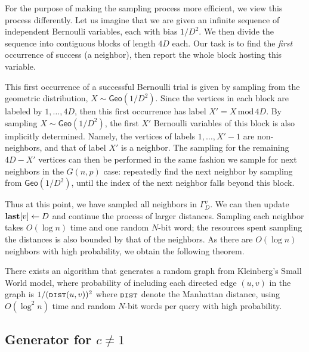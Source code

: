 For the purpose of making the sampling process more efficient, we view this process differently. Let us imagine that we are given an infinite sequence of independent Bernoulli variables, each with bias $1/D^2$.
We then divide the sequence into contiguous blocks of length $4D$ each.
Our task is to find the \emph{first} occurrence of success (a neighbor), then report the whole block hosting this variable.

This first occurrence of a successful Bernoulli trial is given by sampling from the geometric distribution, $X\sim\mathsf{Geo}(1/D^2)$.
Since the vertices in each block are labeled by $1, \ldots, 4D$, then this first occurrence has label $X' = {X\mathrm{\,mod\,}4D}$.
By sampling $X\sim\mathsf{Geo}(1/D^2)$, the first $X'$ Bernoulli variables of this block is also implicitly determined. Namely, the vertices of labels $1, \ldots, X'-1$ are non-neighbors, and that of label $X'$ is a neighbor.
The sampling for the remaining $4D-X'$ vertices can then be performed in the same fashion we sample for next neighbors in the $G(n,p)$ case: 
repeatedly find the next neighbor by sampling from $\mathsf{Geo}(1/D^2)$, until the index of the next neighbor falls beyond this block.

Thus at this point, we have sampled all neighbors in $\Gamma_D^v$. We can then update $\mathbf{last}[v] \leftarrow D$ and continue the process of larger distances.
Sampling each neighbor takes $O(\log n)$ time and one random $N$-bit word; the resources spent sampling the distances is also bounded by that of the neighbors.
As there are $O(\log n)$ neighbors with high probability, we obtain the following theorem.

\begin{theorem}\label{thm-swm}
There exists an algorithm that generates a random graph from Kleinberg's Small World model,
where probability of including each directed edge $(u,v)$ in the graph is $1/(\texttt{\textsc{dist}}(u,v))^2$ where $\texttt{\textsc{dist}}$ denote the Manhattan distance,
using $O(\log^2 n)$ time and random $N$-bit words per  query with high probability.
\end{theorem}

\subsection{Generator for $c \neq 1$}

